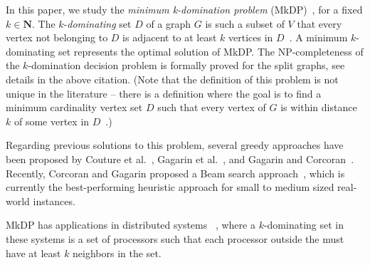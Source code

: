 \documentclass[dvipsnames,format=sigconf,anonymous=true,review=true]{acmart}
\begin{document}
In this paper, we study the \emph{minimum k-domination problem} (MkDP)~\cite{corcoran2021heuristics}, for a fixed $k \in \mathbf{N}$. 
The $k$-\emph{dominating} set $D$ of a graph $G$ is such a subset of $V$ that every vertex not belonging to $D$ is adjacent to at least $k$ vertices in $D$~\cite{lan2013algorithmic}. A minimum $k$-dominating set represents the optimal solution of MkDP. The NP-completeness of the $k$-domination decision problem is formally proved for the split graphs, see details in the above citation. (Note that the definition of this problem is not unique in the literature -- there is a definition where the goal is to find a minimum cardinality vertex set $D$ such that every vertex of $G$ is within distance $k$ of some vertex in $D$~\cite{chang1983k}.) 
 
Regarding previous solutions to this problem, several greedy approaches have been proposed by Couture et al.~\cite{couture2006incremental}, Gagarin et al.~\cite{gagarin2013randomized}, and Gagarin and Corcoran~\cite{gagarin2018multiple}. Recently, Corcoran and Gagarin proposed a Beam search approach~\cite{corcoran2021heuristics}, which is currently the best-performing heuristic approach for small to medium sized real-world instances. 
 
MkDP has applications in distributed systems ~\cite{wang2013minimising}, where a $k$-dominating set in these systems is a set of processors such that each processor outside the must have at least $k$ neighbors in the set.
\end{document}
